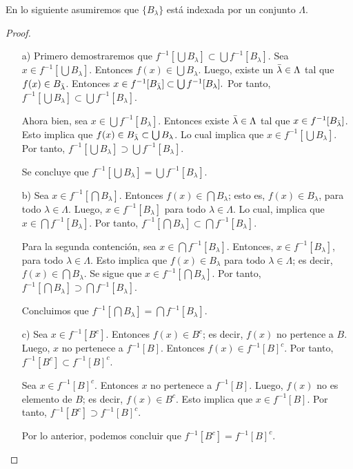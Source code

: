 \documentclass[12pt]{article}
\begin{document}
En lo siguiente asumiremos que $\{B_\lambda\}$ está indexada por un conjunto $\Lambda$.

\begin{proof}
\text{ }
\begin{itemize}
    \item[a)] Primero demostraremos  que  $f^{-1}[\bigcup B_\lambda ] \subset \bigcup f^{-1}[B_\lambda]$. Sea $x \in f^{-1}[\bigcup B_\lambda ]$. Entonces $f(x) \in \bigcup B_\lambda$. Luego, existe un $\Bar{\lambda} \in \Lambda$ tal que $f(x) \in B_{\Bar{\lambda}}$. Entonces $x \in f^{-1}[B_{\Bar{\lambda}}] \subset \bigcup f^{-1}[B_\lambda].$ Por tanto, $f^{-1}[\bigcup B_\lambda ] \subset \bigcup f^{-1}[B_\lambda]$. 
    
    Ahora bien, sea $ x \in  \bigcup f^{-1}[B_\lambda]$. Entonces existe $\Bar{\lambda} \in \Lambda$ tal que $x \in f^{-1}[B_{\Bar{\lambda}}]$. Esto implica que $f(x) \in B_{\Bar{\lambda}} \subset \bigcup B_\lambda$. Lo cual implica que $x \in f^{-1}[\bigcup B_\lambda ].$ Por tanto, $f^{-1}[\bigcup B_\lambda ] \supset \bigcup f^{-1}[B_\lambda]$.
    
    Se concluye que $f^{-1}[\bigcup B_\lambda ] = \bigcup f^{-1}[B_\lambda]$.
    
    \item[b)] Sea $x \in f^{-1}[\bigcap B_\lambda ]$. Entonces $f(x) \in \bigcap B_\lambda $; esto es, $f(x) \in B_\lambda$, para todo $\lambda \in \Lambda$. Luego, $x \in f^{-1}[B_\lambda]$ para todo $\lambda \in \Lambda$. Lo cual, implica que $x \in \bigcap f^{-1}[B_\lambda]$. Por tanto, $f^{-1}[\bigcap B_\lambda ] \subset  \bigcap f^{-1}[B_\lambda]$.
    
    Para la segunda contención, sea $x \in \bigcap f^{-1}[B_\lambda]$. Entonces, $x \in f^{-1}[B_\lambda]$, para todo $\lambda \in \Lambda$. Esto implica que $f(x) \in B_\lambda$ para todo $\lambda \in \Lambda$; es decir, $f(x) \in \bigcap B_\lambda$. Se sigue que $x \in f^{-1}[\bigcap B_\lambda ].$ Por tanto, $f^{-1}[\bigcap B_\lambda ] \supset  \bigcap f^{-1}[B_\lambda]$.
    
    Concluimos que $f^{-1}[\bigcap B_\lambda ] = \bigcap f^{-1}[B_\lambda]$.

    
    \item[c)] Sea $x \in f^{-1}[B^c]$. Entonces $f(x) \in B^c$; es decir, $f(x) $ no pertence a $B$. Luego, $x$ no pertenece a $f^{-1}[B]$. Entonces $f(x) \in f^{-1}[B]^c$. Por tanto, $f^{-1}[B^c] \subset f^{-1}[B]^c$.
    
    Sea $x \in f^{-1}[B]^c$. Entonces $x$ no pertenece a $f^{-1}[B]$. Luego, $f(x)$ no es elemento de $B$; es decir, $f(x) \in B^c$. Esto implica que $x \in f^{-1}[B]$. Por tanto, $f^{-1}[B^c] \supset f^{-1}[B]^c$.
    
    Por lo anterior, podemos concluir que  $f^{-1}[B^c] = f^{-1}[B]^c$.
\end{itemize} 

\end{proof}
\text{ }
\end{document}
